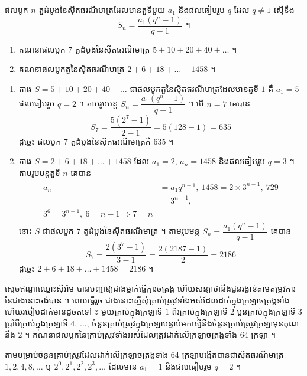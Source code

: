 \begin{formulaBox}[ជាទូទៅ]
ផលបូក $n$ តួដំបូងនៃស៊ីតធរណីមាត្រដែលមានតួទីមួយ $a_1$ និងផលធៀបរួម $q$ ដែល $q \ne 1$ ស្មើនឹង
\[ S_n = \frac{a_1(q^n - 1)}{q - 1} \text{ ។} \]
\end{formulaBox}

\begin{example}[លំហាត់គំរូ ១]
\begin{enumerate}[a]
  \item គណនាផលបូក $7$ តួដំបូងនៃស៊ីតធរណីមាត្រ $5 + 10 + 20 + 40 + \ldots$ ។
  \item គណនាផលបូកតួនៃស៊ីតធរណីមាត្រ $2 + 6 + 18 + \ldots + 1458$ ។
\end{enumerate}
\end{example}
\ans
\begin{enumerate}[a]
  \item តាង $S = 5 + 10 + 20 + 40 + \ldots$ ជាផលបូកតួនៃស៊ីតធរណីមាត្រដែលមានតួទី $1$ គឺ $a_1 = 5$ ផលធៀបរួម $q = 2$ ។ តាមរូបមន្ត $S_n = \dfrac{a_1(q^n - 1)}{q - 1}$ ។ បើ $n = 7$ គេបាន
  \[ S_7 = \frac{5(2^7 - 1)}{2 - 1} = 5(128 - 1) = 635 \]
  ដូច្នេះ ផលបូក $7$ តួដំបូងនៃស៊ីតធរណីមាត្រគឺ $635$ ។
  \item តាង $S = 2 + 6 + 18 + \ldots + 1458$ ដែល $a_1 = 2$, $a_n = 1458$ និងផលធៀបរួម $q = 3$ ។ តាមរូបមន្តតួទី $n$ គេបាន
  \[
\begin{gathered}
\begin{aligned}
a_n &= a_1 q^{n-1},\ 1458 = 2 \times 3^{n-1},\ 729\\
&= 3^{n-1},\\ 3^6 = 3^{n-1},\ 6 = n - 1 \Rightarrow 7 = n
\end{aligned}
\end{gathered}
\]
  នោះ $S$ ជាផលបូក $7$ តួដំបូងនៃស៊ីតធរណីមាត្រ ។ តាមរូបមន្ត $S_n = \dfrac{a_1(q^n - 1)}{q - 1}$ គេបាន
  \[ S_7 = \frac{2(3^7 - 1)}{3 - 1} = \frac{2(2187 - 1)}{2} = 2186 \]
  ដូច្នេះ $2 + 6 + 18 + \ldots + 1458 = 2186$ ។
\end{enumerate}

\begin{example}[លំហាត់គំរូ ២]
ស្តេចឥណ្ឌាឈ្មោះស៊ីរ៉ាម បានបញ្ជាឱ្យជាងម្នាក់ធ្វើក្តារចត្រង្គ ហើយសន្យាថានឹងជូនរង្វាន់តាមតម្រូវការនៃជាងនោះចង់បាន ។ ពេលធ្វើរួច ជាងនោះស្នើសុំគ្រាប់ស្រូវទាំងអស់ដែលដាក់ក្នុងក្រឡាចត្រង្គទាំង ហើយរបៀបដាក់មានដូចតទៅ ៖ មួយគ្រាប់ក្នុងក្រឡាទី $1$ ពីរគ្រាប់ក្នុងក្រឡាទី $2$ បួនគ្រាប់ក្នុងក្រឡាទី $3$ ប្រាំបីគ្រាប់ក្នុងក្រឡាទី $4$, $\ldots$, ចំនួនគ្រាប់ស្រូវក្នុងក្រឡាបន្ទាប់មកស្មើនឹងចំនួនគ្រាប់ស្រូវក្រឡាមុនគុណនឹង $2$ ។ គណនាផលបូកនៃគ្រាប់ស្រូវទាំងអស់ដែលត្រូវដាក់លើក្រឡាចត្រង្គទាំង $64$ ក្រឡា ។
\end{example}
\ans
តាមបម្រាប់ចំនួនគ្រាប់ស្រូវដែលដាក់លើក្រឡាចត្រង្គទាំង $64$ ក្រឡាបង្កើតបានជាស៊ីតធរណីមាត្រ $1, 2, 4, 8, \ldots$ ឬ $2^0, 2^1, 2^2, 2^3, \ldots$ ដែលមាន $a_1 = 1$ និងផលធៀបរួម $q = 2$ ។

